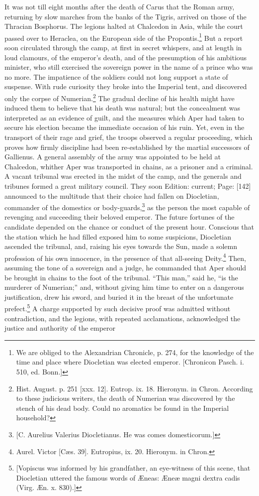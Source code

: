 It was not till eight months after the death of Carus that the Roman army, returning by slow marches from the banks of the Tigris, arrived on those of the Thracian Bosphorus. The legions halted at Chalcedon in Asia, while the court passed over to Heraclea, on the European side of the Propontis.\footnote{We are obliged to the Alexandrian Chronicle, p. 274, for the knowledge of the time and place where Diocletian was elected emperor. [Chronicon Pasch. i. 510, ed. Bonn.]} But a report soon circulated through the camp, at first in secret whispers, and at length in loud clamours, of the emperor\texthebrew{}’s death, and of the presumption of his ambitious minister, who still exercised the sovereign power in the name of a prince who was no more. The impatience of the soldiers could not long support a state of suspense. With rude curiosity they broke into the Imperial tent, and discovered only the corpse of Numerian.\footnote{Hist. August. p. 251 [xxx. 12]. Eutrop. ix. 18. Hieronym. in Chron. According to these judicious writers, the death of Numerian was discovered by the stench of his dead body. Could no aromatics be found in the Imperial household?} The gradual decline of his health might have induced them to believe that his death was natural; but the concealment was interpreted as an evidence of guilt, and the measures which Aper had taken to secure his election became the immediate occasion of his ruin. Yet, even in the transport of their rage and grief, the troops observed a regular proceeding, which proves how firmly discipline had been re-established by the martial successors of Gallienus. A general assembly of the army was appointed to be held at Chalcedon, whither Aper was transported in chains, as a prisoner and a criminal. A vacant tribunal was erected in the midst of the camp, and the generals and tribunes formed a great military council. They soon Edition: current; Page: [142] announced to the multitude that their choice had fallen on Diocletian, commander of the domestics or body-guards,\footnote{[C. Aurelius Valerius Diocletianus. He was comes domesticorum.]} as the person the most capable of revenging and succeeding their beloved emperor. The future fortunes of the candidate depended on the chance or conduct of the present hour. Conscious that the station which he had filled exposed him to some suspicions, Diocletian ascended the tribunal, and, raising his eyes towards the Sun, made a solemn profession of his own innocence, in the presence of that all-seeing Deity.\footnote{Aurel. Victor [Cæs. 39]. Eutropius, ix. 20. Hieronym. in Chron.} Then, assuming the tone of a sovereign and a judge, he commanded that Aper should be brought in chains to the foot of the tribunal. \texthebrew{“}This man,\texthebrew{}” said he, \texthebrew{“}is the murderer of Numerian;\texthebrew{}” and, without giving him time to enter on a dangerous justification, drew his sword, and buried it in the breast of the unfortunate prefect.\footnote{[Vopiscus was informed by his grandfather, an eye-witness of this scene, that Diocletian uttered the famous words of Æneas: Æneæ magni dextra cadis (Virg. Æn. x. 830).]} A charge supported by such decisive proof was admitted without contradiction, and the legions, with repeated acclamations, acknowledged the justice and authority of the emperor 
